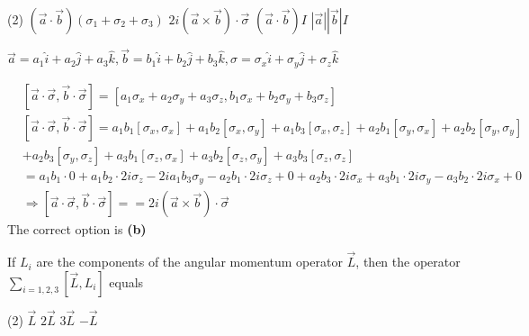 \begin{enumerate}
\begin{minipage}{\textwidth}
\end{minipage}
\begin{tasks}(2)
	\task[\textbf{A.}] $(\vec{a} \cdot \vec{b})\left(\sigma_{1}+\sigma_{2}+\sigma_{3}\right)$
	\task[\textbf{B.}]$2 i(\vec{a} \times \vec{b}) \cdot \vec{\sigma}$
	\task[\textbf{C.}]$(\vec{a} \cdot \vec{b}) I$
	\task[\textbf{D.}]$|\vec{a}||\vec{b}| I$
\end{tasks}
\begin{answer}
	$\vec{a}=a_{1} \hat{i}+a_{2} \hat{j}+a_{3} \hat{k}, \vec{b}=b_{1} \hat{i}+b_{2} \hat{j}+b_{3} \hat{k}, \sigma=\sigma_{x} \hat{i}+\sigma_{y} \hat{j}+\sigma_{z} \hat{k}$
	
	\begin{align*}
	&{[\vec{a} \cdot \vec{\sigma}, \vec{b} \cdot \vec{\sigma}]=\left[a_{1} \sigma_{x}+a_{2} \sigma_{y}+a_{3} \sigma_{z}, b_{1} \sigma_{x}+b_{2} \sigma_{y}+b_{3} \sigma_{z}\right]} \\
	&{[\vec{a} \cdot \vec{\sigma}, \vec{b} \cdot \vec{\sigma}]=a_{1} b_{1}\left[\sigma_{x}, \sigma_{x}\right]+a_{1} b_{2}\left[\sigma_{x}, \sigma_{y}\right]+a_{1} b_{3}\left[\sigma_{x}, \sigma_{z}\right]+a_{2} b_{1}\left[\sigma_{y}, \sigma_{x}\right]+a_{2} b_{2}\left[\sigma_{y}, \sigma_{y}\right]} \\
	&+a_{2} b_{3}\left[\sigma_{y}, \sigma_{z}\right]+a_{3} b_{1}\left[\sigma_{z}, \sigma_{x}\right]+a_{3} b_{2}\left[\sigma_{z}, \sigma_{y}\right]+a_{3} b_{3}\left[\sigma_{z}, \sigma_{z}\right] \\
	&=a_{1} b_{1} \cdot 0+a_{1} b_{2} \cdot 2 i \sigma_{z}-2 i a_{1} b_{3} \sigma_{y}-a_{2} b_{1} \cdot 2 i \sigma_{z}+0+a_{2} b_{3} \cdot 2 i \sigma_{x}+a_{3} b_{1} \cdot 2 i \sigma_{y}-a_{3} b_{2} \cdot 2 i \sigma_{x}+0 \\
	&\Rightarrow[\vec{a} \cdot \vec{\sigma}, \vec{b} \cdot \vec{\sigma}]==2 i(\vec{a} \times \vec{b}) \cdot \vec{\sigma}
	\end{align*}
	The correct option is \textbf{(b)}
\end{answer}
\begin{minipage}{\textwidth}
	\item If $L_{i}$ are the components of the angular momentum operator $\vec{L}$, then the operator $\sum_{i=1,2,3}\left[\vec{L}, L_{i}\right]$ equals
\end{minipage}
\begin{tasks}(2)
	\task[\textbf{A.}] $\vec{L}$
	\task[\textbf{B.}]$2 \vec{L}$
	\task[\textbf{C.}]$3 \vec{L}$
	\task[\textbf{D.}]$-\vec{L}$
\end{tasks}

\end{enumerate}
